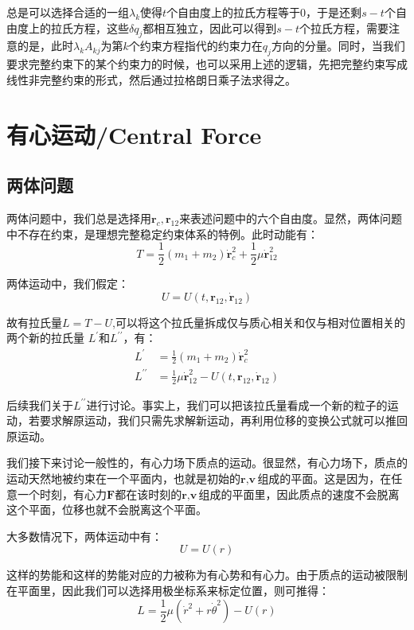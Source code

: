 \documentclass[a4paper, 10pt, openany]{book}%
\begin{document}
    总是可以选择合适的一组$\lambda_k$使得$t$个自由度上的拉氏方程等于0，于是还剩$s-t$个自由度上的拉氏方程，这些$\delta q_j$都相互独立，因此可以得到$s-t$个拉氏方程，需要注意的是，此时$\lambda_kA_{kj}$为第$k$个约束方程指代的约束力在$q_j$方向的分量。同时，当我们要求完整约束下的某个约束力的时候，也可以采用上述的逻辑，先把完整约束写成线性非完整约束的形式，然后通过拉格朗日乘子法求得之。
  
    \chapter{有心运动/Central Force}
    \section{两体问题}
    两体问题中，我们总是选择用$\textbf{r}_c,\textbf{r}_{12}$来表述问题中的六个自由度。显然，两体问题中不存在约束，是理想完整稳定约束体系的特例。此时动能有：
    \begin{equation}T=\frac{1}{2}(m_1+m_2)\dot{\textbf{r}}^2_c+\frac{1}{2}\mu \dot{\textbf{r}}^2_{12}\end{equation}
   
    两体运动中，我们假定：
    \begin{equation}U=U(t,\textbf{r}_{12},\dot{\textbf{r}}_{12})\end{equation}
    
    故有拉氏量$L=T-U$,可以将这个拉氏量拆成仅与质心相关和仅与相对位置相关的两个新的拉氏量 $L^\prime$和$L^{\prime\prime}$，有：
  \begin{align}L^\prime&=\frac{1}{2}(m_1+m_2)\dot{\textbf{r}}^2_c\\L^{\prime\prime}&=\frac{1}{2}\mu \dot{\textbf{r}}^2_{12}-U(t,\textbf{r}_{12},\dot{\textbf{r}}_{12})\end{align}
   
  后续我们关于$L^{\prime\prime}$进行讨论。事实上，我们可以把该拉氏量看成一个新的粒子的运动，若要求解原运动，我们只需先求解新运动，再利用位移的变换公式就可以推回原运动。
  
我们接下来讨论一般性的，有心力场下质点的运动。很显然，有心力场下，质点的运动天然地被约束在一个平面内，也就是初始的$\textbf{r},\textbf{v}$组成的平面。这是因为，在任意一个时刻，有心力$\textbf{F}$都在该时刻的$\textbf{r},\textbf{v}$组成的平面里，因此质点的速度不会脱离这个平面，位移也就不会脱离这个平面。
  
  
  
  大多数情况下，两体运动中有：
    $$U=U(r)$$
    
    这样的势能和这样的势能对应的力被称为有心势和有心力。由于质点的运动被限制在平面里，因此我们可以选择用极坐标系来标定位置，则可推得：
\begin{equation}
  L=\frac{1}{2}\mu(\dot{{r}}^2+{r}\dot{\theta}^2)-U(r)\end{equation}
    
\end{document}
